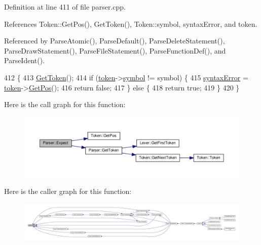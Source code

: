 Definition at line 411 of file parser.\+cpp.



References Token\+::\+Get\+Pos(), Get\+Token(), Token\+::symbol, syntax\+Error, and token.



Referenced by Parse\+Atomic(), Parse\+Default(), Parse\+Delete\+Statement(), Parse\+Draw\+Statement(), Parse\+File\+Statement(), Parse\+Function\+Def(), and Parse\+Ident().


\begin{DoxyCode}
412 \{
413     \hyperlink{classParser_a415a103e66558b4d366d9a1420561fe3}{GetToken}();
414     \textcolor{keywordflow}{if} (\hyperlink{classParser_a467028559d31c5b33f16ca8be56715cc}{token}->\hyperlink{structToken_aa671eaaae5632c5277e89a090d864820}{symbol} != symbol) \{
415         \hyperlink{classParser_ae50a199b804c9f5e8342a4d0a1ae6a95}{syntaxError} = \hyperlink{classParser_a467028559d31c5b33f16ca8be56715cc}{token}->\hyperlink{structToken_a5f93ea94940a6eeb060507e1da594599}{GetPos}();
416         \textcolor{keywordflow}{return} \textcolor{keyword}{false};
417     \} \textcolor{keywordflow}{else} \{
418         \textcolor{keywordflow}{return} \textcolor{keyword}{true};
419     \}
420 \}
\end{DoxyCode}


Here is the call graph for this function\+:\nopagebreak
\begin{figure}[H]
\begin{center}
\leavevmode
\includegraphics[width=350pt]{classParser_a811765334b0cd3f01152c35c9f5bcaec_cgraph}
\end{center}
\end{figure}




Here is the caller graph for this function\+:\nopagebreak
\begin{figure}[H]
\begin{center}
\leavevmode
\includegraphics[width=350pt]{classParser_a811765334b0cd3f01152c35c9f5bcaec_icgraph}
\end{center}
\end{figure}


